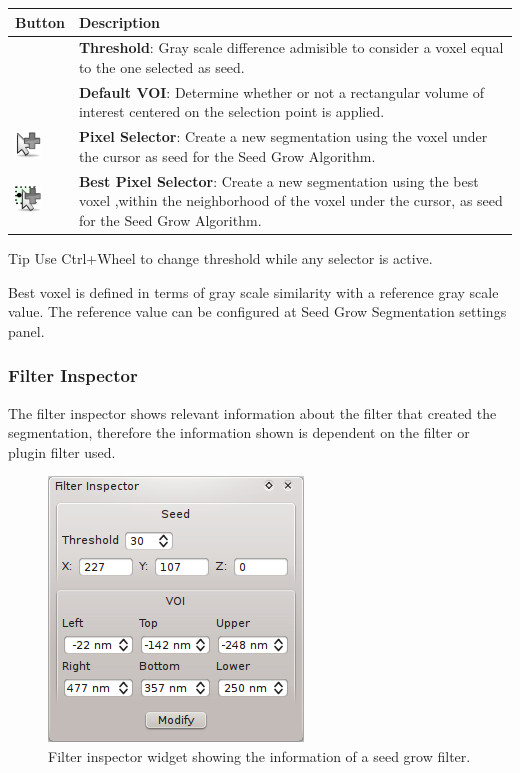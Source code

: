 \begin{tabular}{| m{1.3cm} | m{12cm} |}
\hline
\textbf{Button} & \textbf{Description}\\
\hline
& %
\textbf{Threshold}: Gray scale difference admisible to consider a voxel equal to
the one selected as seed. \\
\hline
& %
\textbf{Default VOI}: Determine whether or not a rectangular volume of interest
centered on the selection point is applied.\\
\hline
\includegraphics[width=0.7cm]{../../frontend/toolbar/seedgrow/rsc/pixelSelector} &
\textbf{Pixel Selector}: Create a new segmentation using the voxel under the
cursor as seed for the Seed Grow Algorithm.\\
\hline
\includegraphics[width=0.7cm]{../../frontend/toolbar/seedgrow/rsc/bestPixelSelector} &
\textbf{Best Pixel Selector}: Create a new segmentation using the best voxel
,within the neighborhood of the voxel under the cursor, as seed for the Seed
Grow Algorithm. \\
\hline
\end{tabular}

\vspace{0.3cm}
\begin{bclogo}[couleur = yellow!33, logo= \bcbook]
{Tip} Use Ctrl+Wheel to change threshold while any selector is active. 
\end{bclogo}
\vspace{0.3cm}

Best voxel is defined in terms of gray scale similarity with a
reference gray scale value. The reference value can be configured at Seed Grow
Segmentation settings panel.\\

\subsubsection{Filter Inspector}
The filter inspector shows relevant information about the filter that created the segmentation,
therefore the information shown is dependent on the filter or plugin filter used.

\begin{figure}[H]
\centering
\includegraphics{fig/SeedGrowSegmentationFilterInspector}
\caption{Filter inspector widget showing the information of a seed grow filter.}
\end{figure}

